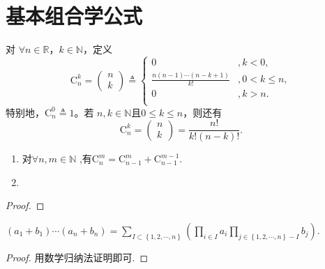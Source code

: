 \documentclass[../../main.tex]{subfiles}
\begin{document}
\section{基本组合学公式}

\begin{definition}[组合数定义的扩充]\label{definition:组合数定义的扩充}
对 \( \forall n \in \mathbb{R} \)，\( k \in \mathbb{N} \)，定义
\[
\mathrm{C}_{n}^{k} = \begin{pmatrix} n \\ k \end{pmatrix} \triangleq \begin{cases}
0&,k<0,\\
\frac{n(n - 1) \cdots (n - k + 1)}{k!}&,0< k\leqslant n ,\\
0&,k>n.\\
\end{cases}
\]
特别地，\( \mathrm{C}_{n}^{0} \triangleq 1 \)。若 \( n, k \in \mathbb{N} \)且$0\leqslant k\leqslant n$，则还有
\[
\mathrm{C}_{n}^{k} = \begin{pmatrix} n \\ k \end{pmatrix} = \frac{n!}{k! (n - k)!}.
\]
\end{definition}

\begin{proposition}[组合数基本公式]\label{proposition:组合数基本性质}
\begin{enumerate}
\item 对$\forall n,m\in \mathbb{N}$ ,有$\mathrm{C}_{n}^{m}=\mathrm{C}_{n-1}^{m}+\mathrm{C}_{n-1}^{m-1}$.

\item 
\end{enumerate}
\end{proposition}
\begin{proof}

\end{proof}

\begin{theorem}[二项式定理的推广]\label{theorem:二项式定理的推广}
$\left( a_1+b_1 \right)\cdots \left( a_n+b_n \right) =\sum_{I\subset \left\{ 1,2,\cdots ,n \right\}}{\left( \prod_{i\in I}{a_i}\prod_{j\in \left\{ 1,2,\cdots ,n \right\} -I}{b_j} \right)}.$
\end{theorem}
\begin{proof}
用数学归纳法证明即可.

\end{proof}
\end{document}

